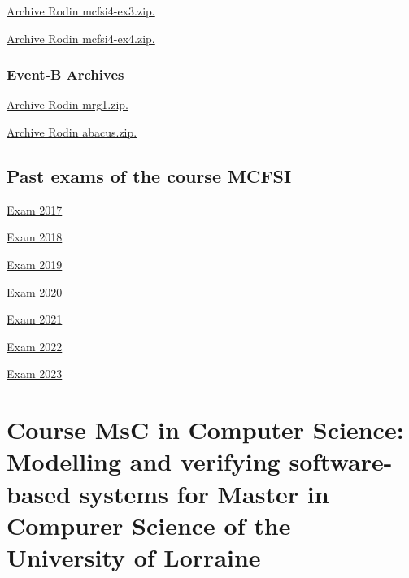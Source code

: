 \documentclass[ 12pt]{article}
\begin{document}
\href{http://mery54.github.io/teaching/mosos/models/mcfsi4-ex3.zip}{Archive 
  Rodin  mcfsi4-ex3.zip.}




\href{http://mery54.github.io/teaching/mosos/models/mcfsi4-ex4.zip}{Archive 
  Rodin  mcfsi4-ex4.zip.}





 \subsubsection{Event-B Archives}
\label{sec:event-b-archives}






\href{http://mery54.github.io/teaching/mosos/models/mrg1.zip}{Archive 
  Rodin  mrg1.zip.}

\href{http://mery54.github.io/teaching/mosos/models/abacus.zip}{Archive 
  Rodin  abacus.zip.}


\subsection{Past exams  of  the course MCFSI}
\label{sec:past-exams-course}


\href{http://mery54.github.io/teaching/mosos/lecturesnotes/exam2017.pdf}{Exam   2017}


\href{http://mery54.github.io/teaching/mosos/lecturesnotes/exam2018.pdf}{Exam   2018}


\href{http://mery54.github.io/teaching/mosos/lecturesnotes/exam2019.pdf}{Exam   2019}

\href{http://mery54.github.io/teaching/mosos/lecturesnotes/exam2020.pdf}{Exam   2020}

\href{http://mery54.github.io/teaching/mosos/lecturesnotes/exam2021.pdf}{Exam   2021}


\href{http://mery54.github.io/teaching/mosos/lecturesnotes/exam2022.pdf}{Exam   2022}


\href{http://mery54.github.io/teaching/mosos/lecturesnotes/exam2023.pdf}{Exam 
  2023}


\hrulefill






\section{Course  MsC in Computer Science:  Modelling and verifying software-based systems for
  Master in Compurer Science of the University of Lorraine}
\label{sec:course-modell-verify}
\end{document}
